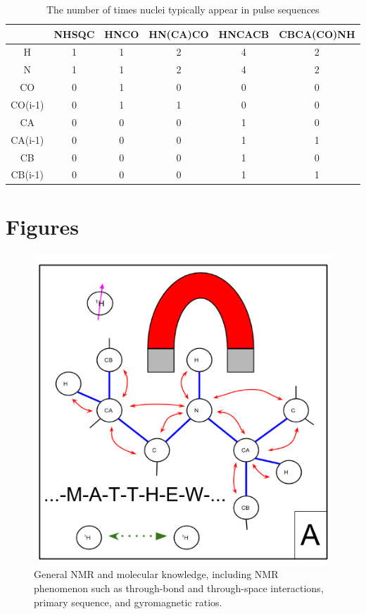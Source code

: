 \begin{table}
    \begin{tabular}{ | c || c | c | c | c | c |}
    \hline
              & NHSQC & HNCO & HN(CA)CO & HNCACB & CBCA(CO)NH \\
    \hline
      H       & 1 & 1 & 2 & 4 & 2 \\
    \hline
      N       & 1 & 1 & 2 & 4 & 2 \\
    \hline
      CO      & 0 & 1 & 0 & 0 & 0 \\
    \hline
      CO(i-1) & 0 & 1 & 1 & 0 & 0 \\
    \hline
      CA      & 0 & 0 & 0 & 1 & 0 \\
    \hline
      CA(i-1) & 0 & 0 & 0 & 1 & 1 \\
    \hline
      CB      & 0 & 0 & 0 & 1 & 0 \\
    \hline
      CB(i-1) & 0 & 0 & 0 & 1 & 1 \\
    \hline
    \end{tabular}
    \caption{The number of times nuclei typically appear in pulse sequences}
    \label{pulse_sequences}
\end{table}


\clearpage
\section{Figures}

\begin{figure}[h]
  \includegraphics[scale=0.7]{figures/data_overview_1}
  \caption[General NMR and molecular knowledge.]
          {General NMR and molecular knowledge, including NMR phenomenon
           such as through-bond and through-space interactions, primary
           sequence, and gyromagnetic ratios.}
  \label{data_overview_1}
\end{figure}

